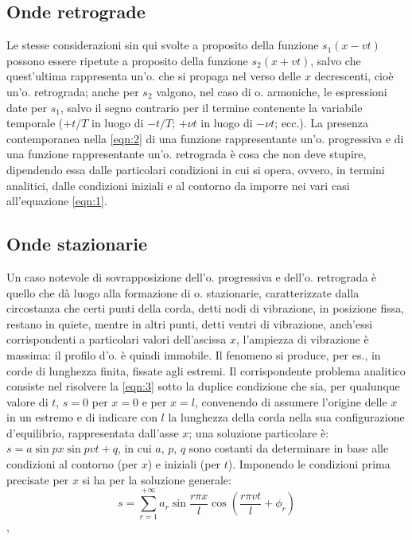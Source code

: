 \documentclass[a4paper]{article}
\begin{document}
\subsection{Onde retrograde}
Le stesse considerazioni sin qui svolte a proposito della funzione $s_1(x-vt)$ possono essere ripetute a proposito della funzione $s_2(x+vt)$, salvo che quest'ultima rappresenta un'o. che si propaga nel verso delle $x$ decrescenti, cioè un'o. retrograda; anche per $s_2$ valgono, nel caso di o. armoniche, le espressioni date per $s_1$, salvo il segno contrario per il termine contenente la variabile temporale ($+t/T$ in luogo di $-t/T$; $+\nu t$ in luogo di $-\nu t$; ecc.). La presenza contemporanea nella \eqref{eqn:2} di una funzione rappresentante un'o. progressiva e di una funzione rappresentante un'o. retrograda è cosa che non deve stupire, dipendendo essa dalle particolari condizioni in cui si opera, ovvero, in termini analitici, dalle condizioni iniziali e al contorno da imporre nei vari casi all'equazione \eqref{eqn:1}. 

\subsection{Onde stazionarie}
Un caso notevole di sovrapposizione dell'o. progressiva e dell'o. retrograda è quello che dà luogo alla formazione di o. stazionarie, caratterizzate dalla circostanza che certi punti della corda, detti nodi di vibrazione, in posizione fissa, restano in quiete, mentre in altri punti, detti ventri di vibrazione, anch'essi corrispondenti a particolari valori dell'ascissa $x$, l'ampiezza di vibrazione è massima: il profilo d'o. è quindi immobile. Il fenomeno si produce, per es., in corde di lunghezza finita, fissate agli estremi. Il corrispondente problema analitico consiste nel risolvere la \eqref{eqn:3} sotto la duplice condizione che sia, per qualunque valore di $t$, $s=0$ per $x=0$ e per $x=l$, convenendo di assumere l'origine delle $x$ in un estremo e di indicare con $l$ la lunghezza della corda nella sua configurazione d'equilibrio, rappresentata dall'asse $x$; una soluzione particolare è: $s=a \sin px \sin{pvt+q}$, in cui $a$, $p$, $q$ sono costanti da determinare in base alle condizioni al contorno (per $x$) e iniziali (per $t$). Imponendo le condizioni prima precisate per $x$ si ha per la soluzione generale: 
\begin{equation}
\label{eqn:11}
s=\sum_{r=1}^{+\infty}a_r\sin\frac{r\pi x}{l}\cos(\frac{r\pi vt}{l}+\phi_r)
\end{equation},
\end{document}
